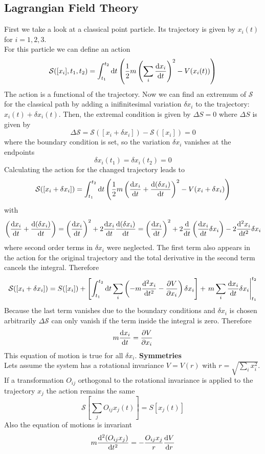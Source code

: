 \documentclass{include/thesisclass}
\newcommand{\SSS}{\mathcal{S}}
\newcommand{\dd}{{\rm d}}
\newcommand{\p}{\partial}
\begin{document}
\subsection{Lagrangian Field Theory}
First we take a look at a classical point particle. Its trajectory is given by $x_i(t)$ for $i = 1,2,3$.\\
For this particle we can define an action
\[ \SSS( [x_i], t_1, t_2 ) = \int_{t_1}^{t_2} \dd t \left(\frac{1}{2} m \left( \sum_i \frac{\dd x_i}{\dd t} \right)^2 - V(x_i(t)) \right)
\]
The action is a functional of the trajectory. Now we can find an extremum of $\SSS$ for the classical path by adding a inifinitesimal variation $\delta x_i$ to the trajectory: $x_i(t) + \delta x_i(t)$. Then, the extremal condition is given by $\Delta S = 0$ where $\Delta S$ is given by
\[ \Delta \SSS = \SSS( [x_i + \delta x_i]) - \SSS([x_i]) = 0\]
where the boundary condition is set, so the variation $\delta x_i$ vanishes at the endpoints
\[ \delta x_i(t_1) = \delta x_i(t_2) = 0\]
Calculating the action for the changed trajectory leads to
\[ \SSS( [x_i + \delta x_i]) = \int_{t_1}^{t_2} \dd t \left( \frac{1}{2} m \left( \frac{\dd x_i}{\dd t} + \frac{\dd (\delta x_i)}{\dd t} \right)^2 - V(x_i + \delta x_i) \right)
\]
with
\[  \left( \frac{\dd x_i}{\dd t} + \frac{ \dd ( \delta x_i)}{\dd t} \right) = \left( \frac{ \dd x_i}{\dd t} \right)^2 + 2 \frac{ \dd x_i }{\dd t} \frac{ \dd (\delta x_i)}{\dd t} = \left( \frac{\dd x_i}{\dd t} \right)^2 + 2 \frac{\dd}{\dd t} \left( \frac{\dd x_i}{\dd t} \delta x_i \right) - 2 \frac{ \dd ^2 x_i}{\dd t^2} \delta x_i\]
where second order terms in $\delta x_i$ were neglected. The first term also appears in the action for the original trajectory and the total derivative in the second term cancels the integral. Therefore
\[ 
\SSS( [x_i + \delta x_i]) = S([x_i]) + \left[ \int_{t_1}^{t_2} \dd t \sum_i \left( -m \frac{\dd ^2 x_i}{\dd t^2} - \frac{\p V}{\p x_i} \right) \delta x_i \right] + \left. m \sum_i \frac{\dd x_i}{\dd t} \delta x_i \right|_{t_1}^{t_2}
\]
Because the last term vanishes due to the boundary conditions and $\delta x_i$ is chosen arbitrarily $\Delta \SSS$ can only vanish if the term inside the integral is zero. Therefore
\[ 
m \frac{\dd x_i }{\dd t} = \frac{\p V}{\p x_i}
\]
This equation of motion is true for all $\delta x_i$.
\newline\newline
\textbf{Symmetries}\\
Lets assume the system has a rotational invariance $V = V(r)$ with $r = \sqrt{ \sum_i x_i^2}$. If a transformation $O_{ij}$ orthogonal to the rotational invariance is applied to the trajectory $x_j$ the action remains the same
\[ \SSS[ \sum_j O_{ij} x_j (t) ] = S[x_j(t)]\]
Also the equation of motions is invariant
\[ m \frac{ \dd^2 ( O_{ij} x_j)}{\dd t^2} = - \frac{ O_{ij} x_j}{r} \frac{\dd V}{\dd r} \]
\end{document}
